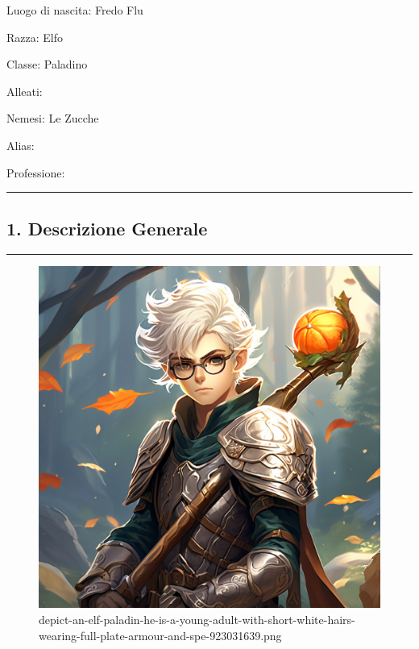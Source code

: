 Luogo di nascita: Fredo Flu

Razza: Elfo

Classe: Paladino

Alleati:

Nemesi: Le Zucche

Alias:

Professione:

\begin{center}\rule{0.5\linewidth}{0.5pt}\end{center}

\subsection{1. Descrizione Generale}\label{descrizione-generale}

\begin{center}\rule{0.5\linewidth}{0.5pt}\end{center}

\begin{figure}
\centering
\includegraphics{depict-an-elf-paladin-he-is-a-young-adult-with-short-white-hairs-wearing-full-plate-armour-and-spe-923031639.png}
\caption{depict-an-elf-paladin-he-is-a-young-adult-with-short-white-hairs-wearing-full-plate-armour-and-spe-923031639.png}
\end{figure}

